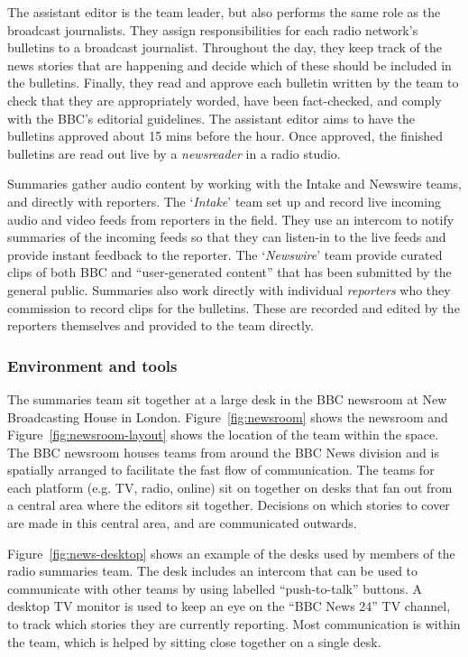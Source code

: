 The assistant editor is the team leader, but also performs the same role as the broadcast journalists. They assign
responsibilities for each radio network's bulletins to a broadcast journalist. Throughout the day, they keep track of
the news stories that are happening and decide which of these should be included in the bulletins. Finally, they read
and approve each bulletin written by the team to check that they are appropriately worded, have been fact-checked, and
comply with the BBC's editorial guidelines.  The assistant editor aims to have the bulletins approved about 15 mins
before the hour.  Once approved, the finished bulletins are read out live by a \textit{newsreader} in a radio studio.

Summaries gather audio content by working with the Intake and Newswire teams, and directly with reporters. The
`\textit{Intake}' team set up and record live incoming audio and video feeds from reporters in the field. They use an
intercom to notify summaries of the incoming feeds so that they can listen-in to the live feeds and provide instant
feedback to the reporter. The `\textit{Newswire}' team provide curated clips of both BBC and ``user-generated content''
that has been submitted by the general public. Summaries also work directly with individual \textit{reporters} who they
commission to record clips for the bulletins. These are recorded and edited by the reporters themselves and provided to
the team directly.

\subsubsection{Environment and tools}
The summaries team sit together at a large desk in the BBC newsroom at New Broadcasting House in London.
Figure~\ref{fig:newsroom} shows the newsroom and Figure~\ref{fig:newsroom-layout} shows the location of the team within
the space. The BBC newsroom houses teams from around the BBC News division and is spatially arranged to facilitate the
fast flow of communication. The teams for each platform (e.g. TV, radio, online) sit on together on desks that fan out
from a central area where the editors sit together. Decisions on which stories to cover are made in this central area,
and are communicated outwards.

Figure~\ref{fig:news-desktop} shows an example of the desks used by members of the radio summaries team. The desk
includes an intercom that can be used to communicate with other teams by using labelled ``push-to-talk'' buttons. A
desktop TV monitor is used to keep an eye on the ``BBC News 24'' TV channel, to track which stories they are currently
reporting. Most communication is within the team, which is helped by sitting close together on a single desk.


